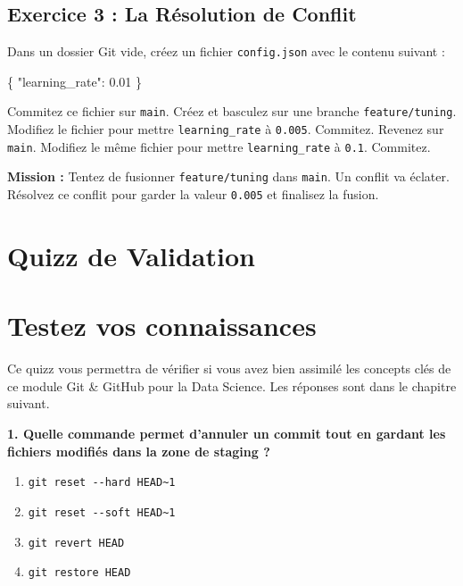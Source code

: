 \documentclass[
  letterpaper,
  DIV=11,
  numbers=noendperiod]{scrreprt}
\newenvironment{Shaded}{\begin{snugshade}}{\end{snugshade}}
\newcommand{\DataTypeTok}[1]{\textcolor[rgb]{0.68,0.00,0.00}{#1}}
\newcommand{\FloatTok}[1]{\textcolor[rgb]{0.68,0.00,0.00}{#1}}
\newcommand{\FunctionTok}[1]{\textcolor[rgb]{0.28,0.35,0.67}{#1}}
\providecommand{\tightlist}{%
  \setlength{\itemsep}{0pt}\setlength{\parskip}{0pt}}
\begin{document}
\subsection{Exercice 3 : La Résolution de
Conflit}\label{exercice-3-la-ruxe9solution-de-conflit}

Dans un dossier Git vide, créez un fichier \texttt{config.json} avec le
contenu suivant :

\begin{Shaded}
\begin{Highlighting}[]
\FunctionTok{\{}
  \DataTypeTok{"learning\_rate"}\FunctionTok{:} \FloatTok{0.01}
\FunctionTok{\}}
\end{Highlighting}
\end{Shaded}

Commitez ce fichier sur \texttt{main}. Créez et basculez sur une branche
\texttt{feature/tuning}. Modifiez le fichier pour mettre
\texttt{learning\_rate} à \texttt{0.005}. Commitez. Revenez sur
\texttt{main}. Modifiez le même fichier pour mettre
\texttt{learning\_rate} à \texttt{0.1}. Commitez.

\textbf{Mission :} Tentez de fusionner \texttt{feature/tuning} dans
\texttt{main}. Un conflit va éclater. Résolvez ce conflit pour garder la
valeur \texttt{0.005} et finalisez la fusion.


\section{Quizz de Validation}\label{quizz-de-validation}


\section{Testez vos connaissances}\label{testez-vos-connaissances}

Ce quizz vous permettra de vérifier si vous avez bien assimilé les
concepts clés de ce module Git \& GitHub pour la Data Science. Les
réponses sont dans le chapitre suivant.

\textbf{1. Quelle commande permet d'annuler un commit tout en gardant
les fichiers modifiés dans la zone de staging ?}

\begin{enumerate}
\def\labelenumi{\Alph{enumi})}
\tightlist
\item
  \texttt{git\ reset\ -\/-hard\ HEAD\textasciitilde{}1}
\item
  \texttt{git\ reset\ -\/-soft\ HEAD\textasciitilde{}1}
\item
  \texttt{git\ revert\ HEAD}
\item
  \texttt{git\ restore\ HEAD}
\end{enumerate}
\end{document}
